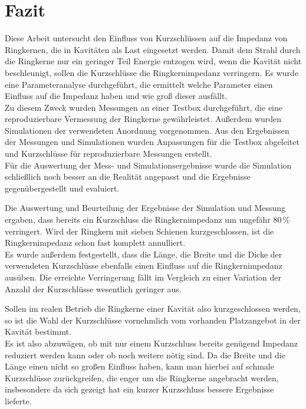 \section{Fazit}
Diese Arbeit untersucht den Einfluss von Kurzschlüssen auf die Impedanz von Ringkernen, die in Kavitäten als Last eingesetzt werden. Damit dem Strahl durch die Ringkerne nur ein geringer Teil Energie entzogen wird, wenn die Kavität nicht beschleunigt, sollen die Kurzschlüsse die Ringkernimpedanz verringern. Es wurde eine Parameteranalyse durchgeführt, die ermittelt welche Parameter einen Einfluss auf die Impedanz haben und wie groß dieser ausfällt.\\
Zu diesem Zweck wurden Messungen an einer Testbox durchgeführt, die eine reproduzierbare Vermessung der Ringkerne gewährleistet. Außerdem wurden Simulationen der verwendeten Anordnung vorgenommen. Aus den Ergebnissen der Messungen und Simulationen wurden Anpassungen für die Testbox abgeleitet und Kurzschlüsse für reproduzierbare Messungen erstellt.\\
Für die Auswertung der Mess- und Simulationsergebnisse wurde die Simulation schließlich noch besser an die Realität angepasst und die Ergebnisse gegenübergestellt und evaluiert.
\par
Die Auswertung und Beurteilung der Ergebnisse der Simulation und Messung ergaben, dass bereits ein Kurzschluss die Ringkernimpedanz um ungefähr $80\,\%$ verringert. Wird der Ringkern mit sieben Schienen kurzgeschlossen, ist die Ringkernimpedanz schon fast komplett annulliert.\\
Es wurde außerdem festgestellt, dass die Länge, die Breite und die Dicke der verwendeten Kurzschlüsse ebenfalls einen Einfluss auf die Ringkernimpedanz ausüben. Die erreichte Verringerung fällt im Vergleich zu einer Variation der Anzahl der Kurzschlüsse wesentlich geringer aus.
\par
Sollen im realen Betrieb die Ringkerne einer Kavität also kurzgeschlossen werden, so ist die Wahl der Kurzschlüsse vornehmlich vom vorhanden Platzangebot in der Kavität bestimmt.\\
Es ist also abzuwägen, ob mit nur einem Kurzschluss bereits genügend Impedanz reduziert werden kann oder ob noch weitere nötig sind. Da die Breite und die Länge einen nicht so großen Einfluss haben, kann man hierbei auf schmale Kurzschlüsse zurückgreifen, die enger um die Ringkerne angebracht werden, insbesondere da sich gezeigt hat ein kurzer Kurzschluss bessere Ergebnisse lieferte.
\par
